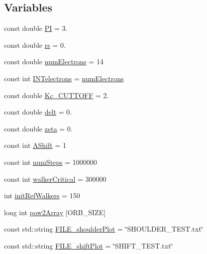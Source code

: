 \subsection*{Variables}
\begin{DoxyCompactItemize}
\item 
const double \hyperlink{UEG__MAIN__binarytest_8C_a952eac791b596a61bba0a133a3bb439f}{P\-I} = 3.
\item 
const double \hyperlink{UEG__MAIN__binarytest_8C_a363ad74e3d4570cd6bfaa4622e0af0bd}{rs} = 0.
\item 
const double \hyperlink{UEG__MAIN__binarytest_8C_a613e167ad809e33c73b70a24822cc6f9}{num\-Electrons} = 14
\item 
const int \hyperlink{UEG__MAIN__binarytest_8C_ace3e2699d268bc86fda1a7a41270c49e}{I\-N\-Telectrons} = \hyperlink{UEG__MAIN__binarytest_8C_a613e167ad809e33c73b70a24822cc6f9}{num\-Electrons}
\item 
const double \hyperlink{UEG__MAIN__binarytest_8C_aa8c8c523b8aaaef95263171d9b078d8d}{Kc\-\_\-\-C\-U\-T\-T\-O\-F\-F} = 2.
\item 
const double \hyperlink{UEG__MAIN__binarytest_8C_aa06f5594efa32a5569766c36690b4a22}{delt} = 0.
\item 
const double \hyperlink{UEG__MAIN__binarytest_8C_a50fb6782013c8c12243ca553cee0971a}{zeta} = 0.
\item 
const int \hyperlink{UEG__MAIN__binarytest_8C_a1b1b50ff28122bf25bbd141938893243}{A\-Shift} = 1
\item 
const int \hyperlink{UEG__MAIN__binarytest_8C_a957840dbdbfa8a29c76754be143dd02f}{num\-Steps} = 1000000
\item 
const int \hyperlink{UEG__MAIN__binarytest_8C_a6c7e0fd46bc659f43a5e2fe841b0aeeb}{walker\-Critical} = 300000
\item 
int \hyperlink{UEG__MAIN__binarytest_8C_a5481ef8ba617908ce12828cc4a8c45a3}{init\-Ref\-Walkers} = 150
\item 
long int \hyperlink{UEG__MAIN__binarytest_8C_a5a4a522e121fab9651a940cabf5ac77d}{pow2\-Array} \mbox{[}O\-R\-B\-\_\-\-S\-I\-Z\-E\mbox{]}
\item 
const std\-::string \hyperlink{UEG__MAIN__binarytest_8C_a707c8ad6d9aee200d8624eae87e2299f}{F\-I\-L\-E\-\_\-shoulder\-Plot} = \char`\"{}S\-H\-O\-U\-L\-D\-E\-R\-\_\-\-T\-E\-S\-T.\-txt\char`\"{}
\item 
const std\-::string \hyperlink{UEG__MAIN__binarytest_8C_a8947574152f3a6b27e38b1f5ea8f61de}{F\-I\-L\-E\-\_\-shift\-Plot} = \char`\"{}S\-H\-I\-F\-T\-\_\-\-T\-E\-S\-T.\-txt\char`\"{}
\end{DoxyCompactItemize}


